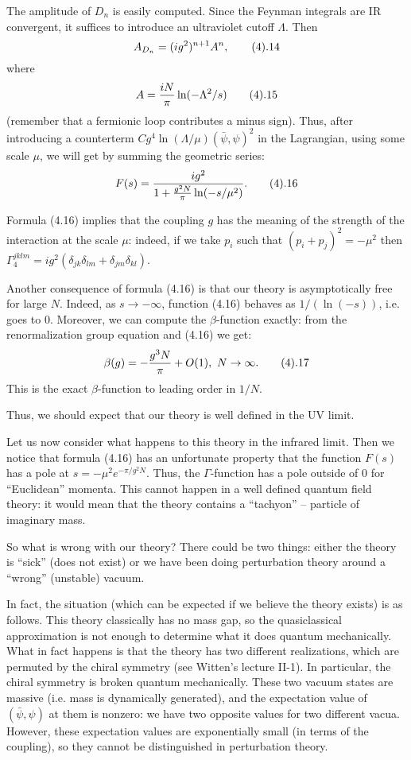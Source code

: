 The amplitude of $D_n$ is easily computed. Since the Feynman integrals
are IR convergent, it suffices to introduce an ultraviolet cutoff $\Lambda$. 
Then 
$$
A_{D_n}=(ig^2)^{n+1}A^n,\tag 4.14
$$
where 
$$
A=\frac{iN}{\pi}\ln(-\Lambda^2/s)\tag 4.15
$$
(remember that a fermionic loop contributes a minus sign). 
Thus, after introducing a counterterm 
$Cg^4\ln(\Lambda/\mu)(\bar\psi,\psi)^2$ in the Lagrangian, 
using some scale $\mu$, we will get by summing the geometric series:
$$
F(s)=\frac{ig^2}{1+\frac{g^2N}{\pi}\ln(-s/\mu^2)}.\tag 4.16
$$

Formula (4.16) implies that the coupling $g$ has the meaning 
of the strength of the interaction at the scale $\mu$: indeed, if 
we take $p_i$ such that $(p_i+p_j)^2=-\mu^2$ then $\Gamma_4^{jklm}=
ig^2(\delta_{jk}\delta_{lm}+\delta_{jm}\delta_{kl})$. 

Another consequence of formula (4.16) is that our theory is asymptotically 
free for large $N$. Indeed, as $s\to -\infty$, function (4.16) behaves as 
$1/(\ln(-s))$, i.e. goes to 0. Moreover, we can compute the $\beta$-function 
exactly: from the renormalization group equation and (4.16) we get:
$$
\beta(g)=-\frac{g^3N}{\pi}+O(1),\ N\to\infty.\tag 4.17 
$$
This is the exact $\beta$-function to leading order in $1/N$. 

Thus, we should expect that our theory is well defined in the UV limit. 

Let us now consider what happens to this theory 
in the infrared limit. 
Then we notice that 
formula (4.16) has an unfortunate property that the function 
$F(s)$ has a pole at $s=-\mu^2e^{-\pi/g^2N}$. Thus, the $\Gamma$-function 
has a pole outside of $0$ for ``Euclidean'' momenta. This cannot happen 
in a well defined quantum field theory: it would mean that the theory 
contains a ``tachyon'' -- particle of imaginary mass.  

So what is wrong with our theory? There could be two things: either 
the theory is ``sick'' (does not exist) or we have been doing 
perturbation theory around a ``wrong'' (unstable) vacuum. 

In fact, the situation (which can be expected if we believe the theory
exists)
is as follows. This theory classically has no mass gap, 
so the quasiclassical approximation is not enough to determine what it does 
quantum mechanically. What in fact happens is that the theory has two 
different realizations, which are permuted by the chiral symmetry
(see Witten's lecture II-1). In particular, the chiral symmetry is broken 
quantum mechanically. These two vacuum states are massive (i.e. mass 
is dynamically generated), and the expectation 
value of $(\bar\psi,\psi)$ at them is nonzero: we have two opposite values for 
two different vacua. However, these expectation values are exponentially 
small (in terms of the coupling), so they cannot be distinguished in 
perturbation theory. 


